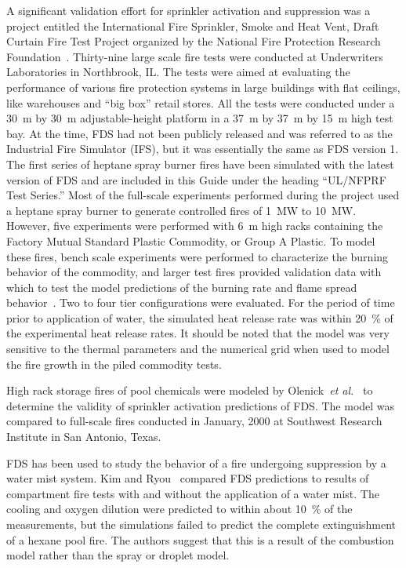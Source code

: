 A   significant  validation  effort   for  sprinkler   activation  and suppression was  a project entitled the  International Fire Sprinkler, Smoke
and Heat Vent, Draft  Curtain Fire Test Project organized by the National   Fire  Protection   Research  Foundation~\cite{McGrattan:5}. Thirty-nine
large scale  fire  tests were  conducted at  Underwriters Laboratories in  Northbrook, IL.  The  tests were aimed  at evaluating the performance of
various  fire protection systems in large buildings with  flat ceilings, like  warehouses and  ``big box''  retail stores. All the  tests were
conducted  under a 30~m by  30~m adjustable-height platform in a 37~m by 37~m by 15~m high test bay. At the time, FDS had not been publicly released
and  was referred to as the Industrial Fire Simulator (IFS), but it was essentially the same as FDS version 1. The first series of heptane spray burner
fires have been simulated with the latest version of FDS and are included in this Guide under the heading ``UL/NFPRF Test Series.''
Most of the full-scale experiments performed during the project used a heptane  spray  burner  to   generate  controlled  fires  of  1~MW  to 10~MW.
However, five  experiments  were performed  with  6~m high  racks containing the  Factory Mutual Standard Plastic Commodity,  or Group A Plastic. To
model these  fires, bench scale experiments were performed to characterize the burning behavior of the commodity, and larger test fires  provided
validation  data  with  which  to   test  the  model predictions    of    the     burning    rate    and    flame    spread
behavior~\cite{Hamins:1,Hamins:IAFSS2002}.     Two   to    four   tier configurations  were  evaluated.  For  the  period  of  time prior  to
application of water, the simulated heat release rate was within 20~\% of the experimental  heat release rates.  It should  be noted that the model
was very  sensitive to the thermal parameters  and the numerical grid when used to model the fire growth in the piled commodity tests.


High rack storage fires of pool chemicals were modeled by Olenick~{\em et  al.}~\cite{Olenick:1}  to  determine  the  validity  of  sprinkler
activation predictions  of FDS.  The model was  compared to full-scale fires conducted  in January, 2000  at Southwest Research  Institute in San
Antonio,  Texas.

FDS  has  been  used  to  study  the behavior  of  a  fire  undergoing suppression     by     a    water     mist     system.     Kim     and
Ryou~\cite{Kim:BE2003,Kim:IJACR2004}   compared  FDS   predictions  to results of compartment fire tests  with and without the application of a water
mist. The cooling and oxygen dilution were predicted to within about 10~\% of the measurements, but the simulations failed to predict the complete
extinguishment of a hexane pool fire. The authors suggest that this is a result of the combustion model rather than the spray or droplet model.

